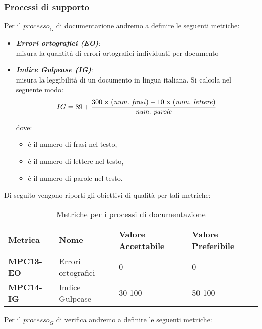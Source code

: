 \subsubsection{Processi di supporto}
Per il $\textit{processo}_G$ di documentazione andremo a definire le seguenti metriche:
\begin{itemize}
    \item \textbf{\emph{Errori ortografici (EO)}}:\\
    misura la quantità di errori ortografici individuati per documento
    \item \textbf{\emph{Indice Gulpease (IG)}}:\\
    misura la leggibilità di un documento in lingua italiana. Si calcola nel seguente modo:
    \[
    IG = 89 + \frac{300 \times (\text{{\emph{num.\ frasi}}}) - 10 \times (\text{\emph{{num.\ lettere}}})}{\text{\emph{{num.\ parole}}}}
    \]

    dove:
    \begin{itemize}
        \item {} \`e il numero di frasi nel testo,
        \item {} \`e il numero di lettere nel testo,
        \item {} \`e il numero di parole nel testo.
    \end{itemize}
    \end{itemize}
Di seguito vengono riporti gli obiettivi di qualità per tali metriche:
\begin{table}[htbp]
    \centering
    \begin{tabular}{|>{\centering\arraybackslash}p{4cm}|p{4cm}|p{4cm}|p{4cm}|}
    \hline
    \rowcolor{gray!30}
    \textbf{Metrica} & \textbf{Nome} & \textbf{Valore Accettabile} & \textbf{Valore Preferibile} \\
    \hline
    \rowcolor{gray!10}
    \textbf{MPC13-EO} & Errori ortografici & 0 & 0 \\
    \hline
    \rowcolor{gray!10}
    \textbf{MPC14-IG} & Indice Gulpease & 30-100 & 50-100 \\
    \hline
    \end{tabular}
    \caption{Metriche per i processi di documentazione}
    \label{tab:metriche_fornitura}
\end{table}
Per il $\textit{processo}_G$ di verifica andremo a definire le seguenti metriche:
